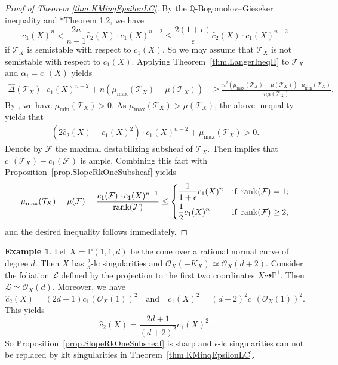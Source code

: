 \documentclass[12pt,twoside]{amsart}
\DeclareMathOperator{\rank}{rank}
\theoremstyle{definition}
\newtheorem{ex}[thm]{Example}
\begin{document}
	\begin{proof}[Proof of Theorem \ref{thm.KMinqEpsilonLC}]
		By the $\mathbb{Q}$-Bogomolov--Gieseker inequality and \cite{GrebKebekusPeternell2021}*{Theorem 1.2}, we have
 \[
 c_1(X)^{n}<\frac{2n}{n-1} \hat{c}_2(X)\cdot c_1(X)^{n-2}\leq \frac{2(1+\epsilon)}{\epsilon} \hat{c}_2(X)\cdot c_1(X)^{n-2}
 \]
 if $\mathcal{T}_X$ is semistable with respect to $c_1(X)$.
 So we may assume that $\mathcal{T}_X$ is not semistable with respect to $c_1(X)$. Applying Theorem~\ref{thm.LangerIneqII} to $\mathcal{T}_X$ and $\alpha_i=c_1(X)$ yields
		\begin{align*}
			\hat{\Delta}(\mathcal{T}_X)\cdot c_1(X)^{n-2} + n\left(\mu_{\max}(\mathcal{T}_X)-\mu(\mathcal{T}_X)\right)
			& \geq \frac{n^2\left(\mu_{\max}(\mathcal{T}_X)-\mu(\mathcal{T}_X)\right) \cdot \mu_{\min}(\mathcal{T}_X)}{n\mu(\mathcal{T}_X)}.
		\end{align*}
		By \cite[Proposition~3.6]{LiuLiu2023}, we have $\mu_{\min}(\mathcal{T}_X)>0$. As $\mu_{\max}(\mathcal{T}_X)>\mu(\mathcal{T}_X)$, the above inequality yields that
		\begin{align*}
			\left(2\hat{c}_2(X) - c_1(X)^2\right)\cdot c_1(X)^{n-2} + \mu_{\max}(\mathcal{T}_X) > 0.
		\end{align*}
		Denote by $\mathcal{F}$ the maximal destabilizing subsheaf of $\mathcal{T}_X$. Then \cite[Proposition~3.6]{LiuLiu2023} implies that $c_1(\mathcal{T}_X)-c_1(\mathcal{F})$ is ample. Combining this fact with Proposition~\ref{prop.SlopeRkOneSubsheaf} yields
		\[
		\mu_{\max}(\mathcal{T}_X) = \mu(\mathcal{F})=\frac{c_1(\mathcal{F})\cdot c_1(X)^{n-1}}{\rank (\mathcal{F})} \leq \begin{dcases}\frac{1}{1+\epsilon} c_1(X)^n &\text{if } \rank (\mathcal{F})=1;\\
		   \frac{1}{2} c_1(X)^n &\text{if }  \rank (\mathcal{F})\geq 2,
		\end{dcases}
		\]
		and the desired inequality follows immediately.
	\end{proof}
	
	\begin{ex}
		Let $X=\mathbb{P}(1,1,d)$ be the cone over a rational normal curve of degree $d$. Then $X$ has $\frac{2}{d}$-lc singularities and $\mathcal{O}_X(-K_X)\simeq \mathcal{O}_X(d+2)$. Consider the foliation $\mathcal{L}$ defined by the projection to the first two coordinates $X\dashrightarrow \mathbb{P}^1$. Then $\mathcal{L}\simeq \mathcal{O}_X(d)$. Moreover, we have
		\[
		\hat{c}_2(X)=(2d+1)c_1(\mathcal{O}_X(1))^2\quad \text{and} \quad c_1(X)^2 = (d+2)^2c_1(\mathcal{O}_X(1))^2.
		\]
		This yields
		\[
		{\hat{c}_2(X)} = \frac{2d+1}{(d+2)^2}{c_1(X)^2}.
		\]
		So Proposition~\ref{prop.SlopeRkOneSubsheaf} is sharp and $\epsilon$-lc singularities can not be replaced by klt singularities in Theorem~\ref{thm.KMinqEpsilonLC}.
	\end{ex}
\end{document}
